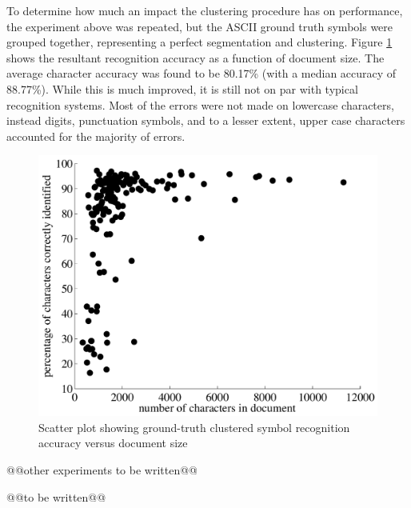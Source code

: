 \documentclass[times, 10pt,twocolumn]{article}
\begin{document}
To determine how much an impact the clustering procedure has on performance,
the experiment above was repeated, but the ASCII ground truth symbols were
grouped together, representing a perfect segmentation and clustering.  Figure
\ref{gtcharacc_fig} shows the resultant recognition accuracy as a function of
document size.  The average character accuracy was found to be 80.17\% (with a
median accuracy of 88.77\%).  While this is much improved, it is still not on
par with typical recognition systems.  Most of the errors were not made on
lowercase characters, instead digits, punctuation symbols, and to a lesser
extent, upper case characters accounted for the majority of errors.

\begin{figure}[ht]
  \centering
  \includegraphics[scale=.4]{figures/gt_character_accuracy}
  \caption{Scatter plot showing ground-truth clustered symbol recognition 
  accuracy versus document size}
  \label{gtcharacc_fig}
\end{figure}

@@other experiments to be written@@


@@to be written@@




\end{document}
